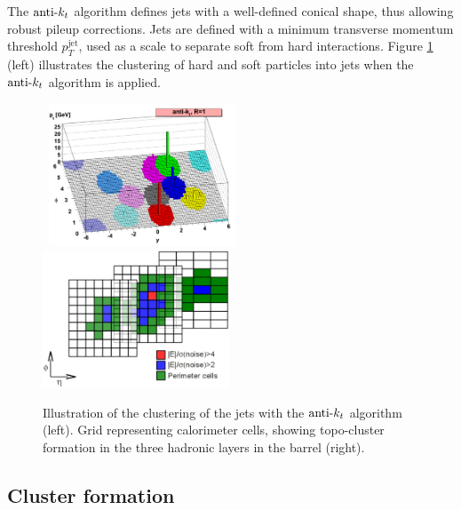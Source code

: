 The $\akt$ algorithm defines jets with a well-defined conical shape, thus allowing robust pileup corrections.
Jets are defined with a minimum transverse momentum threshold $p_T^{\text{jet}}$, used as a scale to separate soft from hard interactions.
Figure \ref{fig:JetTopoClusterAntiKt} (left) illustrates the clustering of hard and soft particles into jets when the $\akt$ algorithm is applied.

\begin{figure}[!ht]
  \begin{center}
    \mbox{
      \includegraphics[width=0.495\textwidth]{ObjectReconstruction/Figures/JetAntiKt.eps}
      \includegraphics[width=0.495\textwidth]{ObjectReconstruction/Figures/JetClusterFormation.eps}
    }
  \end{center}
  \caption[Illustration of the ``active'' catchment area of the $\akt$ algorithm (left). Topo-cluster formation in the three hadronic layers in the barrel and $\akt$ jet algorithm representation (right).]{
  Illustration of the clustering of the jets with the $\akt$ algorithm~\protect\cite{Cacciari:2008gp} (left).
    Grid representing calorimeter cells, showing topo-cluster formation in the three hadronic layers in the barrel (right). 
  }
  \label{fig:JetTopoClusterAntiKt}
\end{figure}



\subsection{Cluster formation}
    \label{subsec:JetClusterFormation}

